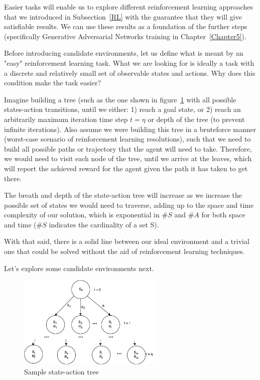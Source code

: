 Easier tasks will enable us to explore different reinforcement learning approaches that we introduced in Subsection~\ref{RL} with the guarantee that they will give satisfiable results. We can use these results as a foundation of the further steps (specifically Generative Adversarial Networks training in Chapter~\ref{Chapter5}).

Before introducing candidate environments, let us define what is meant by an "easy" reinforcement learning task. What we are looking for is ideally a task with a discrete and relatively small set of observable states and actions. Why does this condition make the task easier?

Imagine building a tree (such as the one shown in figure~\ref{fig:RLTree} with all possible states-action transitions, until we either: 1) reach a goal state, or 2) reach an arbitrarily maximum iteration time step $t = \eta$ or depth of the tree (to prevent infinite iterations). Also assume we were building this tree in a bruteforce manner (worst-case scenario of reinforcement learning resolutions), such that we need to build all possible paths or trajectory that the agent will need to take. Therefore, we would need to visit each node of the tree, until we arrive at the leaves, which will report the achieved reward for the agent given the path it has taken to get there.

The breath and depth of the state-action tree will increase as we increase the possible set of states we would need to traverse, adding up to the space and time complexity of our solution, which is exponential in $\#S$ and $\#A$ for both space and time ($\#S$ indicates the cardinality of a set S).

With that said, there is a solid line between our ideal environment and a trivial one that could be solved without the aid of reinforcement learning techniques.

Let's explore some candidate environments next.
\begin{figure}
\centering
\includegraphics[width=7cm]{Figures/RLTree}
\caption{Sample state-action tree}
\label{fig:RLTree}
\end{figure}

